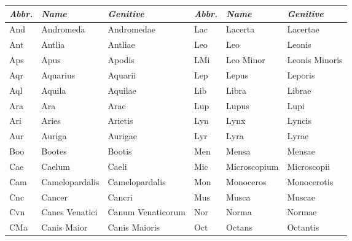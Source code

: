 \begin{table}[p]
    \footnotesize\centering
  \begin{tabular}{lll||lll}
    \toprule
\emph{Abbr.} & \emph{Name} & \emph{Genitive} & \emph{Abbr.} & \emph{Name}   & \emph{Genitive}       \\\midrule
And & Andromeda            & Andromedae            & Lac & Lacerta              & Lacertae              \\
Ant & Antlia               & Antliae               & Leo & Leo                  & Leonis                \\
Aps & Apus                 & Apodis                & LMi & Leo Minor            & Leonis Minoris        \\
Aqr & Aquarius             & Aquarii               & Lep & Lepus                & Leporis               \\
Aql & Aquila               & Aquilae               & Lib & Libra                & Librae                \\
Ara & Ara                  & Arae                  & Lup & Lupus                & Lupi                  \\
Ari & Aries                & Arietis               & Lyn & Lynx                 & Lyncis                \\
Aur & Auriga               & Aurigae               & Lyr & Lyra                 & Lyrae                 \\
Boo & Bootes               & Bootis                & Men & Mensa                & Mensae                \\
Cae & Caelum               & Caeli                 & Mic & Microscopium         & Microscopii           \\
Cam & Camelopardalis       & Camelopardalis        & Mon & Monoceros            & Monocerotis           \\
Cnc & Cancer               & Cancri                & Mus & Musca                & Muscae                \\
Cvn & Canes Venatici       & Canum Venaticorum     & Nor & Norma                & Normae                \\
CMa & Canis Maior          & Canis Maioris         & Oct & Octans               & Octantis              \\

\end{tabular}
\end{table}
